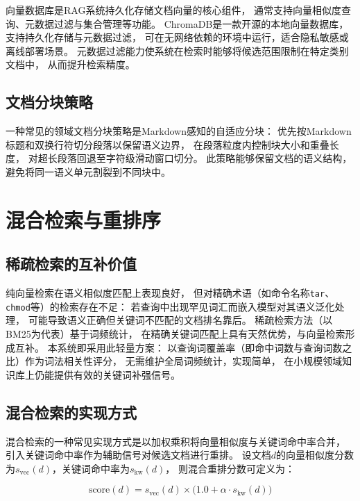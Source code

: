 向量数据库是RAG系统持久化存储文档向量的核心组件，
通常支持向量相似度查询、元数据过滤与集合管理等功能。
ChromaDB是一款开源的本地向量数据库，支持持久化存储与元数据过滤，
可在无网络依赖的环境中运行，适合隐私敏感或离线部署场景。
元数据过滤能力使系统在检索时能够将候选范围限制在特定类别文档中，
从而提升检索精度。

\subsection{文档分块策略}

一种常见的领域文档分块策略是Markdown感知的自适应分块：
优先按Markdown标题和双换行符切分段落以保留语义边界，
在段落粒度内控制块大小和重叠长度，
对超长段落回退至字符级滑动窗口切分。
此策略能够保留文档的语义结构，避免将同一语义单元割裂到不同块中。

\section{混合检索与重排序}

\subsection{稀疏检索的互补价值}

纯向量检索在语义相似度匹配上表现良好，
但对精确术语（如命令名称\texttt{tar}、\texttt{chmod}等）的检索存在不足：
若查询中出现罕见词汇而嵌入模型对其语义泛化处理，
可能导致语义正确但关键词不匹配的文档排名靠后。
稀疏检索方法（以BM25为代表）基于词频统计，
在精确关键词匹配上具有天然优势，与向量检索形成互补。
本系统即采用此轻量方案：
以查询词覆盖率（即命中词数与查询词数之比）作为词法相关性评分，
无需维护全局词频统计，实现简单，
在小规模领域知识库上仍能提供有效的关键词补强信号。

\subsection{混合检索的实现方式}

混合检索的一种常见实现方式是以加权乘积将向量相似度与关键词命中率合并，
引入关键词命中率作为辅助信号对候选文档进行重排。
设文档$d$的向量相似度分数为$s_\text{vec}(d)$，关键词命中率为$s_\text{kw}(d)$，
则混合重排分数可定义为：

\begin{equation}
\text{score}(d) = s_\text{vec}(d) \times \bigl(1.0 + \alpha \cdot s_\text{kw}(d)\bigr)
\end{equation}

